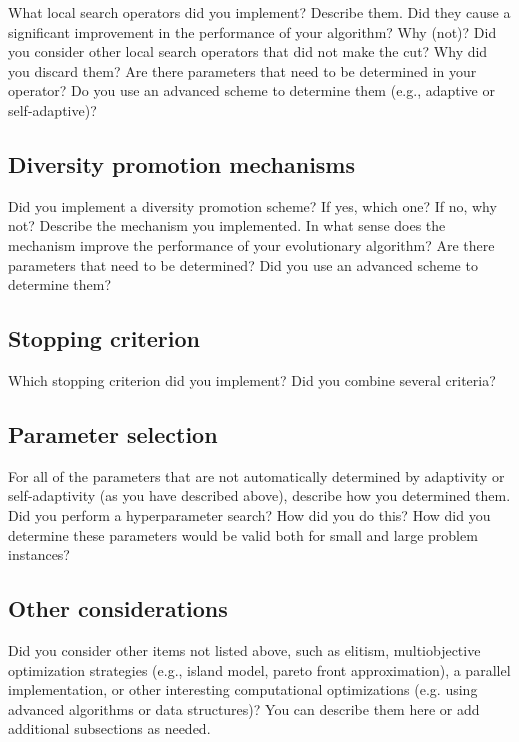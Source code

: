 \documentclass[a4paper,10pt]{article}
\newcommand{\ReplaceMe}[1]{{\color{blue}#1}}
\begin{document}
\ReplaceMe{What local search operators did you implement? Describe them. Did they cause a significant improvement in the performance of your algorithm? Why (not)? Did you consider other local search operators that did not make the cut? Why did you discard them? Are there parameters that need to be determined in your operator? Do you use an advanced scheme to determine them (e.g., adaptive or self-adaptive)?}

\subsection{Diversity promotion mechanisms}

\ReplaceMe{Did you implement a diversity promotion scheme? If yes, which one? If no, why not? Describe the mechanism you implemented. In what sense does the mechanism improve the performance of your evolutionary algorithm? Are there parameters that need to be determined? Did you use an advanced scheme to determine them?}

\subsection{Stopping criterion}

\ReplaceMe{Which stopping criterion did you implement? Did you combine several criteria?}

\subsection{Parameter selection}

\ReplaceMe{For all of the parameters that are not automatically determined by adaptivity or self-adaptivity (as you have described above), describe how you determined them. Did you perform a hyperparameter search? How did you do this? How did you determine these parameters would be valid both for small and large problem instances?}

\subsection{Other considerations}\label{sec_oth}

\ReplaceMe{Did you consider other items not listed above, such as elitism, multiobjective optimization strategies (e.g., island model, pareto front approximation), a parallel implementation, or other interesting computational optimizations (e.g. using advanced algorithms or data structures)? You can describe them here or add additional subsections as needed.}
\end{document}
